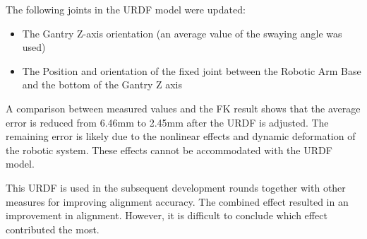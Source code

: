 \FloatBarrier

The following joints in the URDF model were updated:

\begin{itemize}
	\item The Gantry Z-axis orientation (an average value of the swaying angle was used)
	\item The Position and orientation of the fixed joint between the Robotic Arm Base and the bottom of the Gantry Z axis
\end{itemize}

A comparison between measured values and the FK result shows that the average error is reduced from 6.46mm to 2.45mm after the URDF is adjusted. The remaining error is likely due to the nonlinear effects and dynamic deformation of the robotic system. These effects cannot be accommodated with the URDF model.

This URDF is used in the subsequent development rounds together with other measures for improving alignment accuracy. The combined effect resulted in an improvement in alignment. However, it is difficult to conclude which effect contributed the most.

